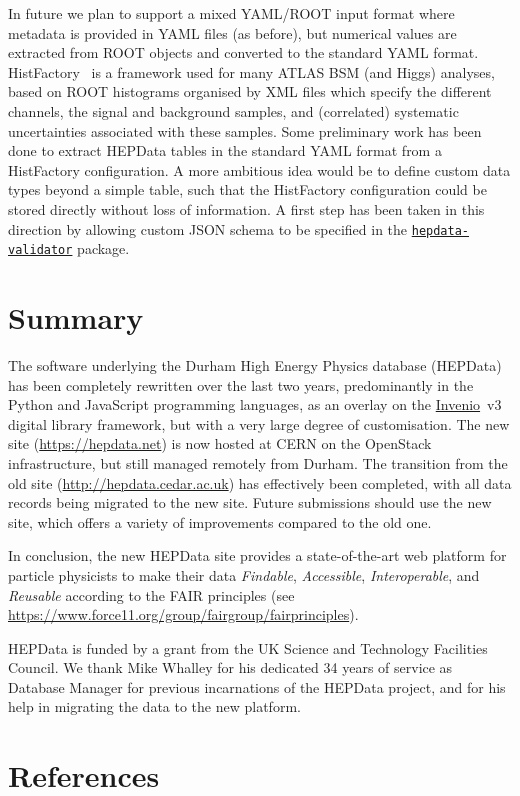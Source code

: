 \documentclass[a4paper]{jpconf}
\begin{document}
In future we plan to support a mixed YAML/ROOT input format where metadata is provided in YAML files (as before), but numerical values are extracted from ROOT objects and converted to the standard YAML format.  HistFactory~\cite{Cranmer:1456844} is a framework used for many ATLAS BSM (and Higgs) analyses, based on ROOT histograms organised by XML files which specify the different channels, the signal and background samples, and (correlated) systematic uncertainties associated with these samples.  Some preliminary work has been done to extract HEPData tables in the standard YAML format from a HistFactory configuration.  A more ambitious idea would be to define custom data types beyond a simple table, such that the HistFactory configuration could be stored directly without loss of information.  A first step has been taken in this direction by allowing custom JSON schema to be specified in the \href{https://github.com/HEPData/hepdata-validator}{\texttt{hepdata-validator}} package.

\section{Summary}

The software underlying the Durham High Energy Physics database (HEPData) has been completely rewritten over the last two years, predominantly in the Python and JavaScript programming languages, as an overlay on the \href{http://inveniosoftware.org}{Invenio}~v3 digital library framework, but with a very large degree of customisation.  The new site (\url{https://hepdata.net}) is now hosted at CERN on the OpenStack infrastructure, but still managed remotely from Durham.  The transition from the old site (\url{http://hepdata.cedar.ac.uk}) has effectively been completed, with all data records being migrated to the new site.  Future submissions should use the new site, which offers a variety of improvements compared to the old one.

In conclusion, the new HEPData site provides a state-of-the-art web platform for particle physicists to make their data \emph{Findable}, \emph{Accessible}, \emph{Interoperable}, and \emph{Reusable} according to the FAIR principles (see \url{https://www.force11.org/group/fairgroup/fairprinciples}).

\ack
HEPData is funded by a grant from the UK Science and Technology Facilities Council.  We thank Mike Whalley for his dedicated 34 years of service as Database Manager for previous incarnations of the HEPData project, and for his help in migrating the data to the new platform.

\section*{References}


\end{document}
